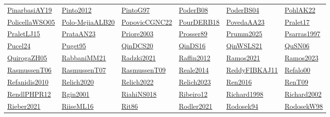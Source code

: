 \begin{longtable}{*{6}{l}}
\hyperref[detail:PinarbasiAY19]{PinarbasiAY19} & \hyperref[detail:Pinto2012]{Pinto2012} & \hyperref[detail:PintoG97]{PintoG97} & \hyperref[detail:PoderB08]{PoderB08} & \hyperref[detail:PoderBS04]{PoderBS04} & \hyperref[detail:PohlAK22]{PohlAK22}\\ 
\hyperref[detail:PolicellaWSO05]{PolicellaWSO05} & \hyperref[detail:Polo-MejiaALB20]{Polo-MejiaALB20} & \hyperref[detail:PopovicCGNC22]{PopovicCGNC22} & \hyperref[detail:PourDERB18]{PourDERB18} & \hyperref[detail:PovedaAA23]{PovedaAA23} & \hyperref[detail:Pralet17]{Pralet17}\\ 
\hyperref[detail:PraletLJ15]{PraletLJ15} & \hyperref[detail:PrataAN23]{PrataAN23} & \hyperref[detail:Priore2003]{Priore2003} & \hyperref[detail:Prosser89]{Prosser89} & \hyperref[detail:Prumm2025]{Prumm2025} & \hyperref[detail:Psarras1997]{Psarras1997}\\ 
\hyperref[detail:Pucel24]{Pucel24} & \hyperref[detail:Puget95]{Puget95} & \hyperref[detail:QinDCS20]{QinDCS20} & \hyperref[detail:QinDS16]{QinDS16} & \hyperref[detail:QinWSLS21]{QinWSLS21} & \hyperref[detail:QuSN06]{QuSN06}\\ 
\hyperref[detail:QuirogaZH05]{QuirogaZH05} & \hyperref[detail:RabbaniMM21]{RabbaniMM21} & \hyperref[detail:Radzki2021]{Radzki2021} & \hyperref[detail:Raffin2012]{Raffin2012} & \hyperref[detail:Ramos2021]{Ramos2021} & \hyperref[detail:Ramos2023]{Ramos2023}\\ 
\hyperref[detail:RasmussenT06]{RasmussenT06} & \hyperref[detail:RasmussenT07]{RasmussenT07} & \hyperref[detail:RasmussenT09]{RasmussenT09} & \hyperref[detail:Reale2014]{Reale2014} & \hyperref[detail:ReddyFIBKAJ11]{ReddyFIBKAJ11} & \hyperref[detail:Refalo00]{Refalo00}\\ 
\hyperref[detail:Refanidis2010]{Refanidis2010} & \hyperref[detail:Relich2020]{Relich2020} & \hyperref[detail:Relich2022]{Relich2022} & \hyperref[detail:Relich2023]{Relich2023} & \hyperref[detail:Ren2016]{Ren2016} & \hyperref[detail:RenT09]{RenT09}\\ 
\hyperref[detail:RendlPHPR12]{RendlPHPR12} & \hyperref[detail:Rgin2001]{Rgin2001} & \hyperref[detail:RiahiNS018]{RiahiNS018} & \hyperref[detail:Ribeiro12]{Ribeiro12} & \hyperref[detail:Richard1998]{Richard1998} & \hyperref[detail:Richard2002]{Richard2002}\\ 
\hyperref[detail:Rieber2021]{Rieber2021} & \hyperref[detail:RiiseML16]{RiiseML16} & \hyperref[detail:Rit86]{Rit86} & \hyperref[detail:Rodler2021]{Rodler2021} & \hyperref[detail:Rodosek94]{Rodosek94} & \hyperref[detail:RodosekW98]{RodosekW98}\\ 

\end{longtable}
